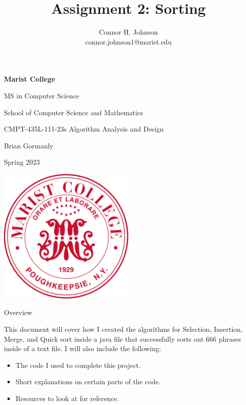 \documentclass[a4paper,12pt]{article}
\title{Assignment 2: Sorting}
\author{Connor H. Johnson \\ connor.johnson1@marist.edu}
\begin{document}
\begin{center} \vfill
\textbf{\Large Marist College}

{\large MS in Computer Science

School of Computer Science and Mathematics \vfill

CMPT-435L-111-23s Algorithm Analysis and Design 

Brian Gormanly

Spring 2023 

\vfill
\includegraphics[width=0.5\textwidth]{Marist.png} \vfill

\emph{\Large\thetitle} \vfill 
\theauthor} \vfill

\end{center} \clearpage
\maketitle

\begin{center}
\begin{large}
    Overview
\end{large}    
\end{center}

\begin{center} \noindent
This document will cover how I created the algorithms for Selection, Insertion, Merge, and Quick sort inside a java file that successfully sorts out 666 phrases inside of a text file. I will also include the following:
\begin{itemize}
\item The code I used to complete this project.
\item Short explanations on certain parts of the code.
\item Resources to look at for reference.

\end{itemize}
\end{center}
\end{document}
